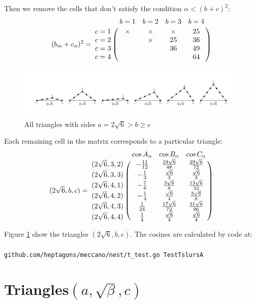 \documentclass[11pt]{article}
\begin{document}
Then we remove the cells that don't satisfy the condition $\alpha < (b+c)^2$:
\begin {equation}\label{E:3}
(b_m + c_n)^2 =\bordermatrix{~ & b=1 & b=2 & b=3 & b=4 \cr
c=1 & \times & \times & \times & 25 \cr    
c=2 & & \times & 25 & 36 \cr    
c=3 & & & 36 & 49 \cr    
c=4 & & & & 64 \cr}
\end {equation}

\begin{figure}[htp]
\centering
\includegraphics[scale=0.9]{tslurA}
\caption{All triangles with sides $a = 2\sqrt{6} > b \ge c$}
\label{tslurA}
\end{figure}
    
Each remaining cell in the matrix corresponds to a particular triangle:
\begin {equation}\label{E:4}
(2\sqrt{6},b,c) =\bordermatrix{~ & \cos{A_{\alpha}} & \cos{B_{\alpha}} & \cos{C_{\alpha}} \cr
(2\sqrt{6},3,2) & -\frac{11}{12} & \frac{19\sqrt{6}}{48} & \frac{29\sqrt{6}}{72} \cr
(2\sqrt{6},3,3) & -\frac{1}{3}   & \frac{\sqrt{6}}{3}    & \frac{\sqrt{6}}{3}    \cr
(2\sqrt{6},4,1) & -\frac{7}{8}   & \frac{3\sqrt{6}}{8}   & \frac{13\sqrt{6}}{32} \cr
(2\sqrt{6},4,2) & -\frac{1}{4}   & \frac{\sqrt{6}}{4}    & \frac{3\sqrt{6}}{8}   \cr
(2\sqrt{6},4,3) &  \frac{1}{24}  & \frac{17\sqrt{6}}{72} & \frac{31\sqrt{6}}{96} \cr
(2\sqrt{6},4,4) &  \frac{1}{4}   & \frac{\sqrt{6}}{4}    & \frac{\sqrt{6}}{4}    \cr}
\end{equation}

Figure \ref{tslurA} show the triangles $(2\sqrt{6},b,c)$. The cosines are calculated by code at:
\\\\
\texttt{github.com/heptagons/meccano/nest/t\_test.go TestTslursA}

\section{Triangles$(a,\sqrt{\beta},c)$}
\end{document}
